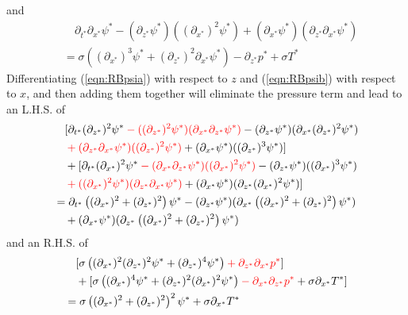 and
\begin{align}
&\quad \partial_{t^*} \partial_{x^*} \psi^* - (\partial_{z^*} \psi^*)((\partial_{x^*})^2 \psi^*) + (\partial_{x^*} \psi^*) (\partial_{z^*} \partial_{x^*} \psi^*) \nonumber \\
&= \sigma\left((\partial_{x^*})^3 \psi^* + (\partial_{z^*})^2 \partial_{x^*} \psi^* \right) - \partial_{z^*} p^* + \sigma T^* \label{eqn:RBpsib}
\end{align}
Differentiating (\ref{eqn:RBpsia}) with respect to $z$ and (\ref{eqn:RBpsib}) with respect to $x$, and then adding them together will eliminate the pressure term and lead to an L.H.S. of
\begin{align*}
&\quad [\partial_{t^*}  (\partial_{z^*} )^2 \psi^* \mathcolor{red}{-((\partial_{z^*} )^2 \psi^*)(\partial_{x^*}  \partial_{z^*}  \psi^*)}  - (\partial_{z^*}  \psi^*)(\partial_{x^*}  (\partial_{z^*} )^2 \psi^*) \\
&\quad \mathcolor{red}{+ (\partial_{z^*}  \partial_{x^*}  \psi^*) ((\partial_{z^*} )^2 \psi^*)} + (\partial_{x^*}  \psi^*) ((\partial_{z^*} )^3 \psi^*)] \\
&\quad + [\partial_{t^*}  (\partial_{x^*} )^2 \psi^* \mathcolor{red}{- (\partial_{x^*} \partial_{z^*}  \psi^*)((\partial_{x^*} )^2 \psi^*)} - (\partial_{z^*}  \psi^*)((\partial_{x^*} )^3 \psi^*) \\
&\quad \mathcolor{red}{+ ((\partial_{x^*} )^2 \psi^*) (\partial_{z^*}  \partial_{x^*}  \psi^*)} + (\partial_{x^*}  \psi^*) (\partial_{z^*}  (\partial_{x^*} )^2 \psi^*)] \\
&= \partial_{t^*}  \left((\partial_{x^*} )^2 + (\partial_{z^*})^2\right) \psi^* - (\partial_{z^*} \psi^*) (\partial_{x^*}  \left((\partial_{x^*})^2 + (\partial_{z^*})^2\right)\psi^*) \\
&\quad + (\partial_{x^*} \psi^*) (\partial_{z^*} \left((\partial_{x^*})^2 + (\partial_{z^*})^2\right)\psi^*) 
\end{align*}
and an R.H.S. of
\begin{align*}
&\quad [\sigma\left((\partial_{x^*})^2(\partial_{z^*})^2 \psi^* + (\partial_{z^*})^4 \psi^* \right) \mathcolor{red}{+ \partial_{z^*} \partial_{x^*} p^*}] \\
&\quad + [\sigma\left((\partial_{x^*})^4 \psi^* + (\partial_{z^*})^2 (\partial_{x^*})^2 \psi^* \right) \mathcolor{red}{- \partial_{x^*} \partial_{z^*} p^*} + \sigma \partial_{x^*} T^*] \\
&= \sigma \left((\partial_{x^*})^2 + (\partial_{z^*})^2\right)^2 \psi^* + \sigma \partial_{x^*} T^*
\end{align*}
